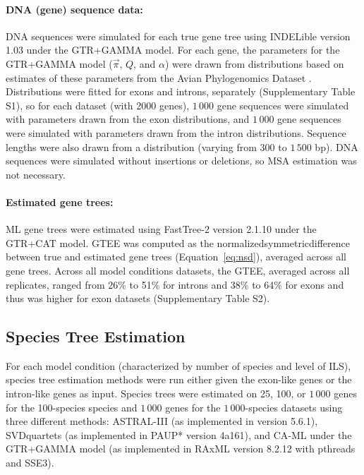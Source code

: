 \paragraph{DNA (gene) sequence data:} 
DNA sequences were simulated for each true gene tree using \gls{INDELible} version 1.03 \cite{fletcher2009indelible} under the \gls{GTR+GAMMA} model.
For each gene, the parameters for the GTR+GAMMA model ($\vec{\pi}$, $Q$, and $\alpha$) were drawn from distributions based on estimates of these parameters from the Avian Phylogenomics Dataset \cite{jarvis2014whole}.
Distributions were fitted for exons and introns, separately (Supplementary Table S1), so for each dataset (with 2000 genes), $1\,000$ gene sequences were simulated with parameters drawn from the exon distributions, and $1\,000$ gene sequences were simulated with parameters drawn from the intron distributions.
Sequence lengths were also drawn from a distribution (varying from 300 to $1\,500$ bp).
DNA sequences were simulated without insertions or deletions, so \gls{MSA} estimation was not necessary.

\paragraph{Estimated gene trees:} 
ML gene trees were estimated using \gls{FastTree-2} version 2.1.10 under the \gls{GTR+CAT} model. 
GTEE was computed as the \gls{normalizedsymmetricdifference} between true and estimated gene trees (Equation~\ref{eq:nsd}), averaged across all gene trees. 
Across all model conditions datasets, the \gls{GTEE}, averaged across all replicates, ranged from 26\% to 51\% for introns and 38\% to 64\% for exons and thus was higher for exon datasets (Supplementary Table S2).

\subsection{Species Tree Estimation}
For each model condition (characterized by number of species and level of ILS), species tree estimation methods were run either given the exon-like genes or the intron-like genes as input. 
Species trees were estimated on 25, 100, or $1\,000$ genes for the 100-species species and $1\,000$ genes for the $1\,000$-species datasets using three different methods: ASTRAL-III (as implemented in version 5.6.1), SVDquartets (as implemented in \gls{PAUP*} version 4a161), and CA-ML under the \gls{GTR+GAMMA} model (as implemented in RAxML version 8.2.12 with pthreads and SSE3).

